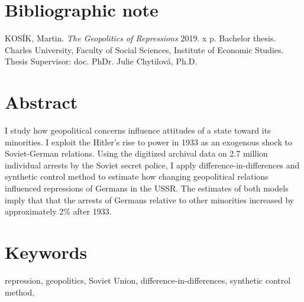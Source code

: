 \pagestyle{empty}

\section*{Bibliographic note}

\noindent KOSÍK, Martin. \textit{The Geopolitics of Repressions}  2019. x p.
Bachelor thesis. Charles University, Faculty of Social Sciences, Institute of Economic Studies. Thesis Supervisor: doc. PhDr. Julie Chytilová, Ph.D. \\

\section*{Abstract}
  I study how geopolitical concerns influence attitudes of a state toward its minorities. I exploit the  Hitler's rise to power in 1933 as an exogenous shock to Soviet-German relations. 
    Using the digitized archival data on 2.7 million individual arrests by the Soviet secret police, I apply difference-in-differences and synthetic control method to estimate how changing geopolitical relations influenced repressions of Germans in the USSR. The estimates of both models imply that that the arrests of Germans relative to other minorities increased by approximately 2\% after 1933. 

\section*{Keywords}
repression, geopolitics, Soviet Union, difference-in-differences, synthetic control method, \\
\newpage


